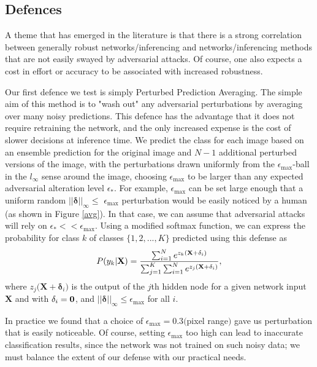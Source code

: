 \documentclass[conference]{IEEEtran}
\begin{document}
\subsection{Defences}

A theme that has emerged in the literature is that there is a strong
correlation between generally robust networks/inferencing and
networks/inferencing methods that are not easily swayed by adversarial
attacks. Of course, one also expects a cost in effort or accuracy to be
associated with increased robustness.

Our first defence we test is simply Perturbed Prediction Averaging. The
simple aim of this method is to "wash out" any adversarial perturbations by
averaging over many noisy predictions. This defence has the advantage that
it does not require retraining the network, and the only increased expense
is the cost of slower decisions at inference time. We predict the class for
each image based on an ensemble prediction for the original image and $N-1$
additional perturbed versions of the image, with the perturbations drawn
uniformly from the $\epsilon _{\max }$-ball in the $l_{\infty }$ sense
around the image, choosing $\epsilon _{\max }$ to be larger than any
expected adversarial alteration level $\epsilon _{\ast }$. For example, $%
\epsilon _{\max }$ can be set large enough that a uniform random $\left\vert
\left\vert \mathbf{\delta }\right\vert \right\vert _{\infty }\leq $ $%
\epsilon _{\max }$ perturbation would be easily noticed by a human (as shown
in Figure \ref{avg}). In that case, we can assume that adversarial attacks
will rely on $\epsilon _{\ast }<<\epsilon _{\max }$. Using a modified
softmax function, we can express the probability for class $k$ of classes $%
\{1,2,...,K\}$ predicted using this defense as%
\begin{equation*}
P(y_{k}\rvert \mathbf{X})=\frac{\sum_{i=1}^{N}e^{z_{k}(\mathbf{X}+\mathbf{%
\delta }_{i}\mathbf{)}}}{\sum_{j=1}^{K}\sum_{i=1}^{N}e^{z_{j}(\mathbf{X}+%
\mathbf{\delta }_{i}\mathbf{)}}},
\end{equation*}%
where $z_{j}(\mathbf{X}+\mathbf{\delta }_{i}\mathbf{)}$ is the output of the 
$j$th hidden node for a given network input $\mathbf{X}$ and with $\mathbf{%
\delta }_{i}=\mathbf{0}$, and $\left\vert \left\vert \mathbf{\delta }%
\right\vert \right\vert _{\infty }\leq \epsilon _{\max }$ for all $i$.

In practice we found that a choice of $\epsilon _{\max }=0.3($pixel range$)$
gave us perturbation that is easily noticeable. Of course, setting $\epsilon
_{\max }$ too high can lead to inaccurate classification results, since the
network was not trained on such noisy data; we must balance the extent of
our defense with our practical needs.
\end{document}
